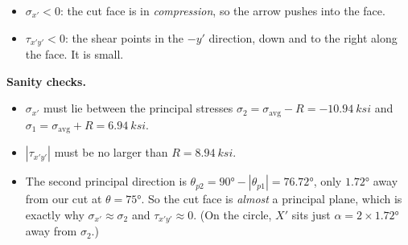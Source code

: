 \documentclass[11pt]{article}
\begin{document}
\noindent
\begin{minipage}[c]{0.45\textwidth}
\centering
{}
\end{minipage}%
\hfill
\begin{minipage}[c]{0.52\textwidth}
\begin{itemize}
  \item $\sigma_{x'} < 0$: the cut face is in \emph{compression}, so the arrow pushes into
        the face.
  \item $\tau_{x'y'} < 0$: the shear points in the $-y'$ direction, down and to the
        right along the face. It is small.
\end{itemize}
\end{minipage}

\bigskip
\noindent
\textbf{Sanity checks.}
\begin{itemize}
  \item $\sigma_{x'}$ must lie between the principal stresses
        $\sigma_2 = \sigma_{\text{avg}} - R = -\SI{10.94}{ksi}$ and
        $\sigma_1 = \sigma_{\text{avg}} + R = \SI{6.94}{ksi}$. \checkmark
  \item $|\tau_{x'y'}|$ must be no larger than $R = \SI{8.94}{ksi}$. \checkmark
  \item The second principal direction is
        $\theta_{p2} = \ang{90} - |\theta_{p1}| = \ang{76.72}$, only $\ang{1.72}$ away from
        our cut at $\theta = \ang{75}$. So the cut face is \emph{almost} a principal plane,
        which is exactly why $\sigma_{x'} \approx \sigma_2$ and $\tau_{x'y'} \approx 0$.
        (On the circle, $X'$ sits just $\alpha = 2 \times \ang{1.72}$ away from $\sigma_2$.)
\end{itemize}
\end{document}
